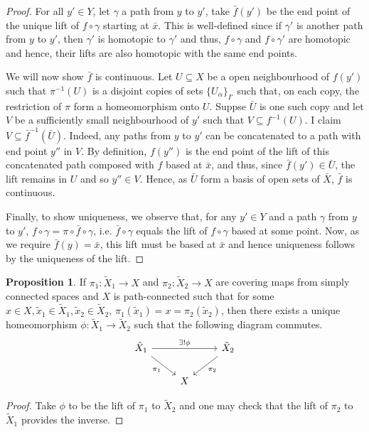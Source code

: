 \documentclass[]{article}
\theoremstyle{definition}
\theoremstyle{definition}
\newtheorem{proposition}{Proposition}[section]
\begin{document}
\begin{proof}
  For all \(y' \in Y\), let \(\gamma\) a path 
  from \(y\) to \(y'\), take \(\bar f(y')\) be the end point of the unique lift of \(f \circ \gamma\) 
  starting at \(\bar x\). This is well-defined since if \(\gamma'\) is another 
  path from \(y\) to \(y'\), then \(\gamma'\) is homotopic to \(\gamma'\) and thus, 
  \(f \circ \gamma\) and \(f \circ \gamma'\) are homotopic and hence, their lifts 
  are also homotopic with the same end points.

  We will now show \(\bar f\) is continuous. Let \(U \subseteq X\) be a open neighbourhood 
  of \(f(y')\) such that \(\pi^{-1}(U)\) is a disjoint copies of sets \(\{U_\alpha\}_{I'}\)
  such that, on each copy, the restriction of \(\pi\) form a homeomorphism onto 
  \(U\). Suppse \(\bar U\) is one such copy and let \(V\) be a sufficiently small 
  neighbourhood of \(y'\) such that \(V \subseteq f^{-1}(U)\). I claim 
  \(V \subseteq \bar f^{-1}(\bar U)\). Indeed, any paths from \(y\) to \(y'\) 
  can be concatenated to a path with end point \(y''\) in \(V\). By definition, 
  \(f(y'')\) is the end point of the lift of this concatenated path composed with \(f\) 
  based at \(\bar x\), and thus, since \(\bar f(y') \in \bar U\), the lift remains 
  in \(U\) and so \(y'' \in V\). Hence, as \(\bar U\) form a basis of open sets of \(\bar X\), 
  \(\bar f\) is continuous.

  Finally, to show uniqueness, we observe that, for any \(y' \in Y\) and 
  a path \(\gamma\) from \(y\) to \(y'\), \(f \circ \gamma = \pi \circ \bar f \circ \gamma\), 
  i.e. \(\bar f \circ \gamma\) equals the lift of \(f \circ \gamma\) based at some point. 
  Now, as we require \(\bar f(y) = \bar x\), this lift must be based at \(\bar x\) 
  and hence uniqueness follows by the uniqueness of the lift. 
\end{proof}

\begin{proposition}
  If \(\pi_1 : \tilde X_1 \to X\) and \(\pi_2 : \tilde X_2 \to X\) are covering maps 
  from simply connected spaces and \(X\) is path-connected such that for some 
  \(x \in X, \tilde x_1 \in \tilde X_1, \tilde x_2 \in \tilde X_2\),
  \(\pi_1(\tilde x_1) = x = \pi_2(\tilde x_2)\), then there exists a unique  
  homeomorphism \(\phi : \tilde X_1 \to \tilde X_2\) such that the following diagram commutes.
  \[\begin{tikzcd}
    {\tilde X_1} && {\tilde X_2} \\
    & X
    \arrow["\exists! \phi", from=1-1, to=1-3]
    \arrow["{\pi_1}"', from=1-1, to=2-2]
    \arrow["{\pi_2}", from=1-3, to=2-2]
  \end{tikzcd}\]
\end{proposition}
\begin{proof}
  Take \(\phi\) to be the lift of \(\pi_1\) to \(\tilde X_2\) and one may check 
  that the lift of \(\pi_2\) to \(\tilde X_1\) provides the inverse.
\end{proof}
\end{document}
